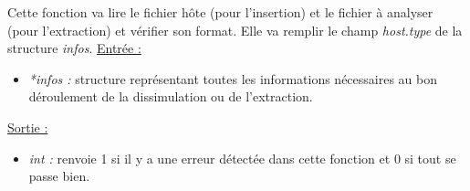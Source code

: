 \documentclass[11pt]{article}
\begin{document}
Cette fonction va lire le fichier hôte (pour l'insertion) et le fichier 
à analyser (pour l'extraction) et vérifier son format. 
Elle va remplir le champ \textit{host.type} de la structure \textit{infos}.  
\newline
\underline{Entrée :}
\begin{itemize}
\item \textit{*infos :} structure représentant toutes les informations 
nécessaires au bon déroulement de la dissimulation ou de l'extraction. 
\end{itemize}
\underline{Sortie :}
\begin{itemize}
\item \textit{int :} renvoie 1 si il y a une erreur détectée dans cette 
fonction et 0 si tout se passe bien.
\newline 
\end{itemize}




\end{document}
